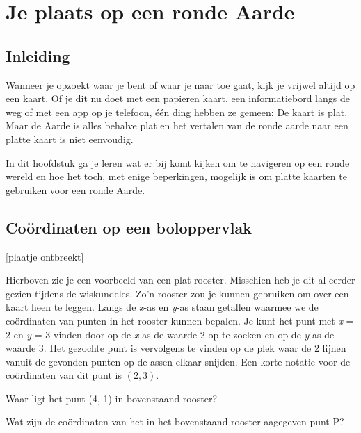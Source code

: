 \chapter{Je plaats op een ronde Aarde}

\section{Inleiding}

Wanneer je opzoekt waar je bent of waar je naar toe gaat, kijk je vrijwel altijd op een kaart. Of je dit nu doet met een papieren kaart, een informatiebord langs de weg of met een app op je telefoon, \'e\'en ding hebben ze gemeen: De kaart is plat. Maar de Aarde is alles behalve plat en het vertalen van de ronde aarde naar een platte kaart is niet eenvoudig.

In dit hoofdstuk ga je leren wat er bij komt kijken om te navigeren op een ronde wereld en hoe het toch, met enige beperkingen, mogelijk is om platte kaarten te gebruiken voor een ronde Aarde.

\section{Co\"ordinaten op een boloppervlak}

[plaatje ontbreekt]

Hierboven zie je een voorbeeld van een plat rooster. Misschien heb je dit al eerder gezien tijdens de wiskundeles. Zo'n rooster zou je kunnen gebruiken om over een kaart heen te leggen. Langs de \textit{x}-as en \textit{y}-as staan getallen waarmee we de co\"ordinaten van punten in het rooster kunnen bepalen. Je kunt het punt met \textit{x} = 2 en \textit{y} = 3 vinden door op de \textit{x}-as de waarde 2 op te zoeken en op de \textit{y}-as de waarde 3. Het gezochte punt is vervolgens te vinden op de plek waar de 2 lijnen vanuit de gevonden punten op de assen elkaar snijden. Een korte notatie voor de co\"ordinaten van dit punt is $(2, 3)$.

\begin{opgave}
	\begin{subopgave}
		Waar ligt het punt (4, 1) in bovenstaand rooster?
	\end{subopgave}
	\begin{subopgave}
		Wat zijn de co\"ordinaten van het in het bovenstaand rooster aagegeven punt P?
	\end{subopgave}
\end{opgave}

